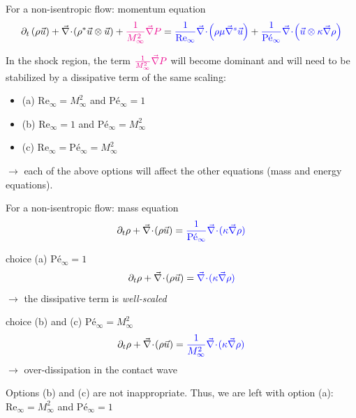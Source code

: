 \documentclass[xcolor=dvipsnames,10pt]{beamer}
\renewcommand{\Re}{\textrm{Re}}
\newcommand{\Pe}{\textrm{P\'e}}
\renewcommand{\div}{\vec{\nabla}\! \cdot \!}
\newcommand{\grad}{\vec{\nabla}}
\newcommand{\gradd}[1]{\vec{\nabla}^{#1}}
\begin{document}
\begin{frame}{For a non-isentropic flow: momentum equation}
\begin{align}
\partial_{t} \left( \rho \vec{u} \right) 
+ \div \left( \rho^* \vec{u}\otimes \vec{u} \right) 
+ \textcolor{magenta}{\frac{1}{M_\infty^2}\grad  P}  
= 
\textcolor{blue}{\frac{1}{\Re_\infty} \div \left( \rho \mu \gradd{s} \vec{u} \right)} +
\textcolor{blue}{\frac{1}{\Pe_\infty} \div \left(\vec{u}\otimes \kappa \grad  \rho \right)} \nonumber
\end{align}
\begin{block}{}
In the shock region, the term $\textcolor{magenta}{\frac{1}{M_\infty^2}\grad  P}  $ will become dominant and will need to be stabilized by a dissipative term of the same scaling:
\begin{itemize}
\setlength{\itemsep}{10pt}
\item (a) $\Re_\infty = M_\infty^2$ and $\Pe_\infty = 1$
\item (b) $\Re_\infty = 1$ and $\Pe_\infty = M_\infty^2$
\item (c) $\Re_\infty = \Pe_\infty = M_\infty^2$
\end{itemize}
$\longrightarrow$ each of the above options will affect the other equations (mass and energy equations).
\end{block}
\end{frame}
\begin{frame}{For a non-isentropic flow: mass equation}
\begin{equation}
\partial_{t} \rho+ \div  \left(  \rho \vec{u}  \right) = \textcolor{blue}{\frac{1}{\Pe_\infty} \div  ( \kappa \grad \rho )} \nonumber
\end{equation}
\begin{block}{choice (a) $\Pe_\infty = 1$}
\begin{equation}
\partial_{t} \rho+ \div  \left(  \rho \vec{u}  \right) = \textcolor{blue}{\div  ( \kappa \grad \rho )} \nonumber
\end{equation}
$\to$ the dissipative term is \emph{well-scaled}
\end{block}
\begin{block}{choice (b) and (c) $\Pe_\infty = M_\infty^2$}
\begin{equation}
\partial_{t} \rho+ \div  \left(  \rho \vec{u}  \right) = \textcolor{blue}{\frac{1}{M_\infty^2} \div  ( \kappa \grad \rho )} \nonumber
\end{equation}
$\to$ over-dissipation in the contact wave
\end{block}
Options (b) and (c) are not inappropriate. Thus, we are left with option (a): $\Re_\infty = M_\infty^2$ and $\Pe_\infty = 1$
\end{frame}
\end{document}
